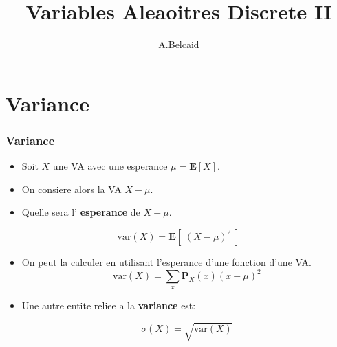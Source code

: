\documentclass{beamer}
\title{Variables Aleaoitres Discrete II}
\author{\underline{A.Belcaid}}
\institute{\small ENSA-Safi}
\renewcommand{\P}{\mathbf{P}}
\newcommand{\E}{\mathbf{E}}
\newcommand{\var}{\text{var}}
\begin{document}
\maketitle
\begin{frame}
\tableofcontents
\end{frame}
\section{Variance}
\begin{frame}[<+->]
  \frametitle{Variance}
  \begin{itemize}
    \scriptsize
    \item Soit $X$ une \acf{VA} avec une esperance $\mu = \E[X]$.\\[4pt]
    \item On consiere alors la \ac{VA}  $X - \mu$.\\[4pt]
    \item Quelle sera l' \alert{\textbf{esperance}}  de $X - \mu$.\\[4pt]
  \end{itemize}
  \pause
  \begin{tcolorbox}[title=Variance]
   \small
   $$
   \var(X) = \E[\;\left(X - \mu\right)^2\;]
   $$
 \end{tcolorbox}

\begin{itemize}
  \scriptsize
  \item On peut la calculer en utilisant l'esperance d'une fonction d'une
    \ac{VA}.
    \small
    \begin{equation*}
      \var(X) = \sum_x \P_X(x) \left(x - \mu\right)^2
    \end{equation*}
  \item Une autre entite reliee a la \textbf{variance} est:
    \begin{tcolorbox}[title=Ecart type]
      $$
      \sigma(X) = \sqrt{\var\left(X\right)} $$
    \end{tcolorbox}
    
\end{itemize}
\end{frame}
\end{document}
